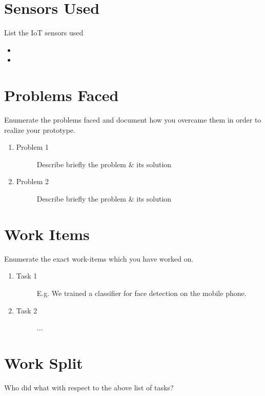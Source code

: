 \documentclass[
10pt, %
a4paper, %
oneside, %
headinclude,footinclude, %
BCOR5mm, %
]{scrartcl}
\begin{document}
\section{Sensors Used}
List the IoT sensors used 
\begin{itemize}
\item 
\item 
\end{itemize}


\section{Problems Faced}
Enumerate the problems faced and document how you overcame them in order to realize your prototype.
\begin{enumerate}
\item 
	\begin{description}
	\item[Problem 1] Describe briefly the problem \& its solution
	\end{description}
	\item 
	\begin{description}
	\item[Problem 2] Describe briefly the problem \& its solution
	\end{description}
\end{enumerate}

\section{Work Items}
Enumerate the exact work-items which you have worked on. 
\begin{enumerate}
\item 
	\begin{description}
	\item[Task 1] E.g. We trained a classifier for face detection on the mobile phone.
	\end{description}
	\item 
	\begin{description}
	\item[Task 2] ...
	\end{description}
\end{enumerate}

\section{Work Split}
Who did what with respect to the above list of tasks?
\end{document}
